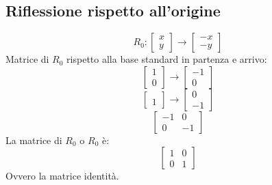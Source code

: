 \documentclass[12pt,a4paper]{article}
\begin{document}
\subsection{Riflessione rispetto all'origine}
\[R_0: 
\begin{bmatrix}
  x\\
  y
\end{bmatrix} \to \begin{bmatrix}
  -x\\
  -y
\end{bmatrix}
\]
Matrice di $R_0$ rispetto alla base standard in partenza e arrivo:
\[
\begin{bmatrix}
  1\\
  0
\end{bmatrix} \to \begin{bmatrix}
  -1\\
  0
\end{bmatrix}
\]
\[
\begin{bmatrix}
  \\
  1
\end{bmatrix} \to \begin{bmatrix}
  0\\
  -1
\end{bmatrix}
\]
\[
\begin{bmatrix}
  -1 & 0\\
  0 & -1
\end{bmatrix}
\]
La matrice di $R_0$ o $R_0$ è:
\[
\begin{bmatrix}
  1 & 0\\
  0 & 1
\end{bmatrix}
\]
Ovvero la matrice identità.
\end{document}
